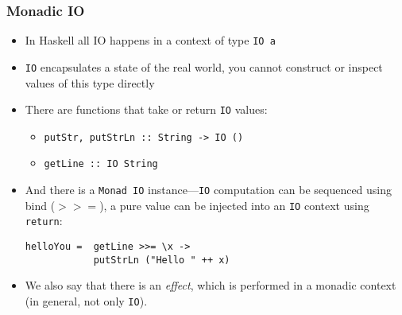 \documentclass[final,handout]{beamer}
\begin{document}
\begin{frame}[fragile]
    \frametitle{Monadic IO}

    \begin{itemize}
        \item In Haskell all IO happens in a context of type \texttt{IO a}
        \item \texttt{IO} encapsulates a state of the real world, you cannot
            construct or inspect values of this type directly

        \item<2-> There are functions that take or return \texttt{IO} values:

            \begin{itemize}
                \item \texttt{putStr, putStrLn :: String -> IO ()}
                \item \texttt{getLine :: IO String}
            \end{itemize}

        \item<3-> And there is a \texttt{Monad IO} instance---\texttt{IO} computation can be
            sequenced using bind ($>>=$), a pure value can be injected into an
            \texttt{IO} context using \texttt{return}:

        \begin{verbatim}
helloYou =  getLine >>= \x -> 
            putStrLn ("Hello " ++ x)
        \end{verbatim}

        \item<4-> We also say that there is an \emph{effect}, which is performed in
            a monadic context (in general, not only \texttt{IO}).
    \end{itemize}
\end{frame}
\end{document}
